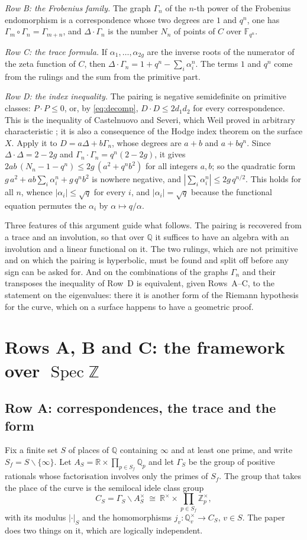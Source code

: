 \documentclass[10pt]{amsart}
\theoremstyle{definition}
\theoremstyle{remark}
\newcommand{\R}{\mathbb R}
\newcommand{\Z}{\mathbb Z}
\newcommand{\Q}{\mathbb Q}
\newcommand{\F}{\mathbb F}
\begin{document}
\emph{Row B: the Frobenius family.} The graph $\Gamma_n$ of the $n$-th power of the Frobenius
endomorphism is a correspondence whose two degrees are $1$ and $q^n$, one has
$\Gamma_m\circ\Gamma_n=\Gamma_{m+n}$, and $\Delta\cdot\Gamma_n$ is the number $N_n$ of points of
$C$ over $\F_{q^n}$.

\emph{Row C: the trace formula.} If $\alpha_1,\dots,\alpha_{2g}$ are the inverse roots of the
numerator of the zeta function of $C$, then $\Delta\cdot\Gamma_n=1+q^n-\sum_i\alpha_i^n$. The
terms $1$ and $q^n$ come from the rulings and the sum from the primitive part.

\emph{Row D: the index inequality.} The pairing is negative semidefinite on primitive classes:
$P\cdot P\le0$, or, by \eqref{eq:decomp}, $D\cdot D\le2d_1d_2$ for every correspondence. This is
the inequality of Castelnuovo and Severi, which Weil proved in arbitrary characteristic
\cite{Weil1948}; it is also a consequence of the Hodge index theorem on the surface $X$. Apply it
to $D=a\Delta+b\Gamma_n$, whose degrees are $a+b$ and $a+bq^n$. Since $\Delta\cdot\Delta=2-2g$ and
$\Gamma_n\cdot\Gamma_n=q^n(2-2g)$, it gives
$2ab\,(N_n-1-q^n)\le2g\,(a^2+q^nb^2)$ for all integers $a,b$; so the quadratic form
$g\,a^2+ab\sum_i\alpha_i^n+g\,q^nb^2$ is nowhere negative, and
$|\sum_i\alpha_i^n|\le2g\,q^{n/2}$. This holds for all $n$, whence $|\alpha_i|\le\sqrt q$ for
every $i$, and $|\alpha_i|=\sqrt q$ because the functional equation permutes the $\alpha_i$ by
$\alpha\mapsto q/\alpha$.

Three features of this argument guide what follows. The pairing is recovered from a trace and
an involution, so that over $\Q$ it suffices to have an algebra with an involution and a linear
functional on it. The two rulings, which are not primitive and on which the pairing is
hyperbolic, must be found and split off before any sign can be asked for. And on the
combinations of the graphs $\Gamma_n$ and their transposes the inequality of Row~D is
equivalent, given Rows~A--C, to the statement on the eigenvalues: there it is another form of the
Riemann hypothesis for the curve, which on a surface happens to have a geometric proof.

\section{Rows A, B and C: the framework over \texorpdfstring{$\operatorname{Spec}\mathbb Z$}{Spec Z}}\label{sec:ABC}
\subsection{Row A: correspondences, the trace and the form}
Fix a finite set $S$ of places of $\Q$ containing $\infty$ and at least one prime, and write
$S_f=S\smallsetminus\{\infty\}$. Let $A_S=\R\times\prod_{p\in S_f}\Q_p$ and let $\Gamma_S$ be the
group of positive rationals whose factorisation involves only the primes of $S_f$. The group
that takes the place of the curve is the semilocal idele class group
\[
 C_S=\Gamma_S\backslash A_S^\times\ \cong\ \R^\times\times\prod_{p\in S_f}\Z_p^\times ,
\]
with its modulus $|\cdot|_S$ and the homomorphisms $j_v\colon\Q_v^\times\to C_S$, $v\in S$. The
paper \cite{P43} does two things on it, which are logically independent.
\end{document}
